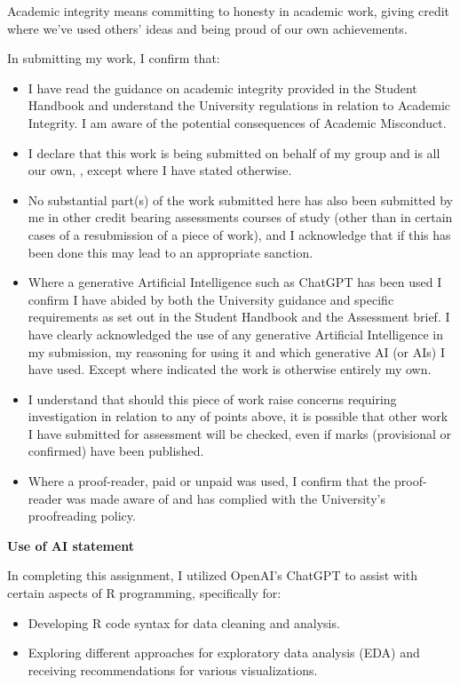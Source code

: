 \documentclass[
]{article}
\begin{document}
Academic integrity means committing to honesty in academic work, giving
credit where we've used others' ideas and being proud of our own
achievements.

In submitting my work, I confirm that:

\begin{itemize}
\item
  I have read the guidance on academic integrity provided in the Student
  Handbook and understand the University regulations in relation to
  Academic Integrity. I am aware of the potential consequences of
  Academic Misconduct.
\item
  I declare that this work is being submitted on behalf of my group and
  is all our own, , except where I have stated otherwise.
\item
  No substantial part(s) of the work submitted here has also been
  submitted by me in other credit bearing assessments courses of study
  (other than in certain cases of a resubmission of a piece of work),
  and I acknowledge that if this has been done this may lead to an
  appropriate sanction.
\item
  Where a generative Artificial Intelligence such as ChatGPT has been
  used I confirm I have abided by both the University guidance and
  specific requirements as set out in the Student Handbook and the
  Assessment brief. I have clearly acknowledged the use of any
  generative Artificial Intelligence in my submission, my reasoning for
  using it and which generative AI (or AIs) I have used. Except where
  indicated the work is otherwise entirely my own.
\item
  I understand that should this piece of work raise concerns requiring
  investigation in relation to any of points above, it is possible that
  other work I have submitted for assessment will be checked, even if
  marks (provisional or confirmed) have been published.
\item
  Where a proof-reader, paid or unpaid was used, I confirm that the
  proof-reader was made aware of and has complied with the University's
  proofreading policy.
\end{itemize}

\textbf{Use of AI statement}

In completing this assignment, I utilized OpenAI's ChatGPT to assist
with certain aspects of R programming, specifically for:

\begin{itemize}
\item
  Developing R code syntax for data cleaning and analysis.
\item
  Exploring different approaches for exploratory data analysis (EDA) and
  receiving recommendations for various visualizations.
\end{itemize}
\end{document}
